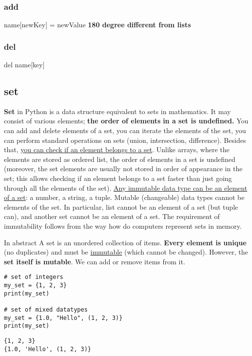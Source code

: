 \documentclass[11pt]{article}
\begin{document}
\subsubsection{add}
\label{sec:org9fd4ebe}
name[newKey] = newValue
\textbf{180 degree different from lists}

\subsubsection{del}
\label{sec:orgcd9e1d1}
del name[key]

\subsection{set}
\label{sec:org29556df}
\textbf{Set} in Python is a data structure equivalent to sets in
mathematics. It may consist of various elements; \textbf{the order of elements}
\textbf{in a set is undefined.} You can add and delete elements of a set, you
can iterate the elements of the set, you can perform standard
operations on sets (union, intersection, difference). Besides that,
\uline{you can check if an element belongs to a set}. Unlike arrays, where the
elements are stored as ordered list, the order of elements in a set is
undefined (moreover, the set elements are usually not stored in order
of appearance in the set; this allows checking if an element belongs
to a set faster than just going through all the elements of the
set). \uline{Any immutable data type can be an element of a set}: a number, a
string, a tuple. Mutable (changeable) data types cannot be elements of
the set. In particular, list cannot be an element of a set (but tuple
can), and another set cannot be an element of a set. The requirement
of immutability follows from the way how do computers represent sets
in memory.

In abstract A set is an unordered collection of items. \textbf{Every element}
\textbf{is unique} (no duplicates) and must be \uline{immutable} (which cannot be
changed). However, the \textbf{set itself is mutable}. We can add or remove
items from it.

\begin{verbatim}
# set of integers
my_set = {1, 2, 3}
print(my_set)

# set of mixed datatypes
my_set = {1.0, "Hello", (1, 2, 3)}
print(my_set)
\end{verbatim}

\begin{verbatim}
{1, 2, 3}
{1.0, 'Hello', (1, 2, 3)}
\end{verbatim}
\end{document}
